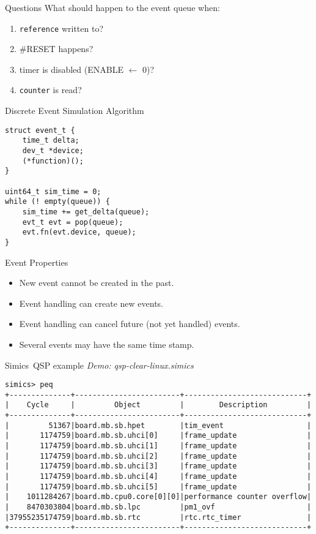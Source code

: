 \begin{frame}{Questions}
What should happen to the event queue when:
\begin{enumerate}
  \item \texttt{reference} written to?\pause
  \item \#RESET happens?\pause
  \item timer is disabled (ENABLE $\leftarrow$ 0)?\pause
  \item \texttt{counter} is read?
\end{enumerate}
\end{frame}

\begin{frame}[fragile]{Discrete Event Simulation Algorithm}
\begin{lstlisting}
struct event_t {
    time_t delta;
    dev_t *device;
    (*function)();
}

uint64_t sim_time = 0;
while (! empty(queue)) {
    sim_time += get_delta(queue);
    evt_t evt = pop(queue);
    evt.fn(evt.device, queue);
}
\end{lstlisting}
\end{frame}

\begin{frame}{Event Properties}
\begin{itemize}
\item New event cannot be created in the past.
\item Event handling can create new events.
\item Event handling can cancel future (not yet handled) events.
\item Several events may have the same time stamp.
\end{itemize}
\end{frame}

\begin{frame}[fragile]{Simics\reg~QSP example}
\emph{Demo: qsp-clear-linux.simics}
\footnotesize{\begin{verbatim}
simics> peq
+--------------+------------------------+----------------------------+
|    Cycle     |         Object         |        Description         |
+--------------+------------------------+----------------------------+
|         51367|board.mb.sb.hpet        |tim_event                   |
|       1174759|board.mb.sb.uhci[0]     |frame_update                |
|       1174759|board.mb.sb.uhci[1]     |frame_update                |
|       1174759|board.mb.sb.uhci[2]     |frame_update                |
|       1174759|board.mb.sb.uhci[3]     |frame_update                |
|       1174759|board.mb.sb.uhci[4]     |frame_update                |
|       1174759|board.mb.sb.uhci[5]     |frame_update                |
|    1011284267|board.mb.cpu0.core[0][0]|performance counter overflow|
|    8470303804|board.mb.sb.lpc         |pm1_ovf                     |
|37955235174759|board.mb.sb.rtc         |rtc.rtc_timer               |
+--------------+------------------------+----------------------------+
\end{verbatim}}
\end{frame}

